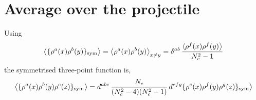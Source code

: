 \documentclass[9pt]{article}
\numberwithin{equation}{section}
\begin{document}
\section{Average over the projectile}\label{sec:E}
Using
\begin{align}
\big\langle\{\rho^{a}(x)\rho^{b}(y)\}_{\rm sym}\big\rangle=\big\langle\rho^{a}(x)\rho^{b}(y)\big\rangle_{x\neq y}=\delta^{ab}\,\frac{\langle\rho^{f}(x)\rho^{f}(y)\big\rangle}{N_{c}^{2}-1}
\end{align}
the symmetrised three-point function is,
\begin{align}
\big\langle\{\rho^{a}(x)\rho^{b}(y)\rho^{c}(z)\}_{\rm sym}\big\rangle=d^{abc}\,\frac{N_{c}}{(N_{c}^{2}-4)(N_{c}^{2}-1)}\,d^{efg}\{\rho^{e}(x)\rho^{f}(y)\rho^{g}(z)\}_{\rm sym}\big\rangle
\end{align}

\end{document}
